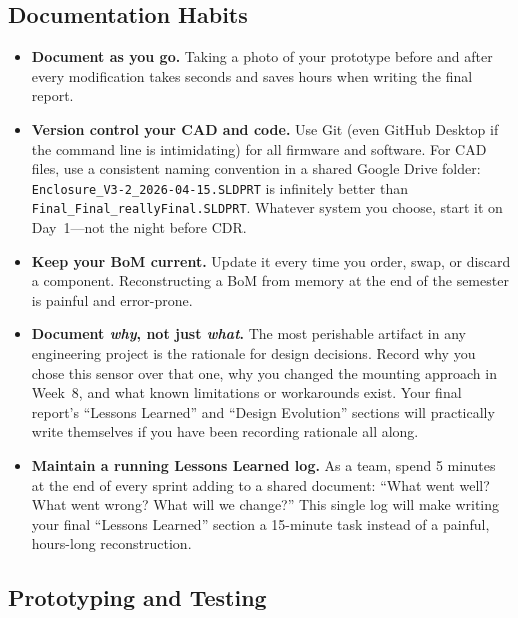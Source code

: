 \documentclass[11pt,letterpaper]{article}
\begin{document}
\subsection{Documentation Habits}

\begin{itemize}[leftmargin=*, itemsep=4pt]
    \item \textbf{Document as you go.} Taking a photo of your prototype before and after every modification takes seconds and saves hours when writing the final report.
    \item \textbf{Version control your CAD and code.} Use Git (even GitHub Desktop if the command line is intimidating) for all firmware and software. For CAD files, use a consistent naming convention in a shared Google Drive folder: \texttt{Enclosure\_V3-2\_2026-04-15.SLDPRT} is infinitely better than \texttt{Final\_Final\_reallyFinal.SLDPRT}. Whatever system you choose, start it on Day~1---not the night before CDR.
    \item \textbf{Keep your BoM current.} Update it every time you order, swap, or discard a component. Reconstructing a BoM from memory at the end of the semester is painful and error-prone.
    \item \textbf{Document \textit{why}, not just \textit{what}.} The most perishable artifact in any engineering project is the rationale for design decisions. Record why you chose this sensor over that one, why you changed the mounting approach in Week~8, and what known limitations or workarounds exist. Your final report's ``Lessons Learned'' and ``Design Evolution'' sections will practically write themselves if you have been recording rationale all along.
    \item \textbf{Maintain a running Lessons Learned log.} As a team, spend 5 minutes at the end of every sprint adding to a shared document: ``What went well? What went wrong? What will we change?'' This single log will make writing your final ``Lessons Learned'' section a 15-minute task instead of a painful, hours-long reconstruction.
\end{itemize}

\subsection{Prototyping and Testing}
\end{document}
